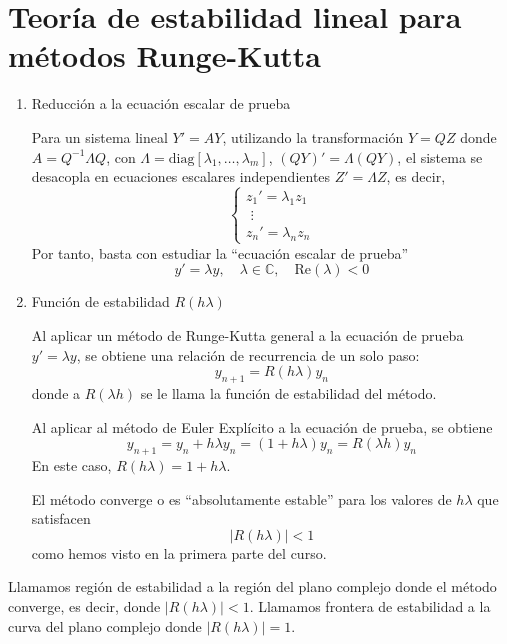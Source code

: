 \section{Teoría de estabilidad lineal para métodos Runge-Kutta}
\begin{enumerate} 
\item Reducción a la ecuación escalar de prueba

Para un sistema lineal $Y' = A Y$, utilizando la transformación $Y = Q Z$ donde $A = Q^{-1} \Lambda Q$, con $\Lambda = \text{diag}[\lambda_1, \dots, \lambda_m]$, $(QY)' = \Lambda (QY)$, el sistema se desacopla en ecuaciones escalares independientes $Z' = \Lambda Z$, es decir, 
$$\begin{cases}
    z_1' = \lambda_1 z_1 \\ \, \, \vdots \\ z_n' = \lambda_n z_n
\end{cases}$$
Por tanto, basta con estudiar la ``ecuación escalar de prueba''
\begin{equation*}
y' = \lambda y, \quad \lambda \in \mathbb{C}, \quad \text{Re}(\lambda) < 0
\end{equation*}

\item Función de estabilidad $R( h\lambda)$

Al aplicar un método de Runge-Kutta general a la ecuación de prueba $y'=\lambda y$, se obtiene una relación de recurrencia de un solo paso:
\begin{equation*} 
y_{n+1} = R( h\lambda) y_n
\end{equation*}
donde a $R(\lambda h)$ se le llama la funci\'on de estabilidad del m\'etodo.
\begin{ejem}
    Al aplicar al m\'etodo de Euler Expl\'icito a la ecuaci\'on de prueba, se obtiene
    $$y_{n+1} = y_n + h \lambda y_n = (1 + h \lambda) y_n = R(\lambda h) y_n$$
    En este caso, $R( h\lambda) = 1 + h \lambda $.
\end{ejem}
El método converge o es ``absolutamente estable'' para los valores de $ h\lambda$ que satisfacen
\begin{equation*}
|R( h\lambda)| < 1
\end{equation*}
como hemos visto en la primera parte del curso. 
\end{enumerate}
\begin{defi}
    Llamamos regi\'on de estabilidad a la regi\'on del plano complejo donde el m\'etodo converge, es decir, donde $|R( h \lambda)| < 1$. Llamamos frontera de estabilidad a la curva del plano complejo donde $|R( h \lambda)| = 1$.
\end{defi}
